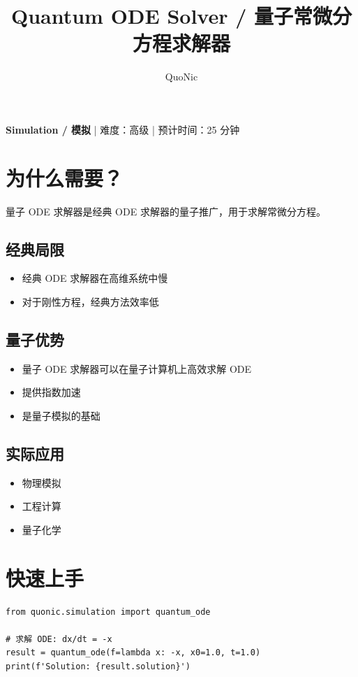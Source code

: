 \documentclass[12pt,a4paper]{article}
\title{Quantum ODE Solver / 量子常微分方程求解器}
\author{QuoNic}
\date{}
\begin{document}
\maketitle

\begin{center}
\textbf{Simulation / 模拟} | 难度：高级 | 预计时间：25 分钟
\end{center}

\tableofcontents
\newpage

\section{为什么需要？}

量子 ODE 求解器是经典 ODE 求解器的量子推广，用于求解常微分方程。

\subsection{经典局限}
\begin{itemize}
  \item 经典 ODE 求解器在高维系统中慢
  \item 对于刚性方程，经典方法效率低
\end{itemize}

\subsection{量子优势}
\begin{itemize}
  \item 量子 ODE 求解器可以在量子计算机上高效求解 ODE
  \item 提供指数加速
  \item 是量子模拟的基础
\end{itemize}

\subsection{实际应用}
\begin{itemize}
  \item 物理模拟
  \item 工程计算
  \item 量子化学
\end{itemize}

\section{快速上手}

\begin{verbatim}
from quonic.simulation import quantum_ode

# 求解 ODE: dx/dt = -x
result = quantum_ode(f=lambda x: -x, x0=1.0, t=1.0)
print(f'Solution: {result.solution}')
\end{verbatim}
\end{document}
